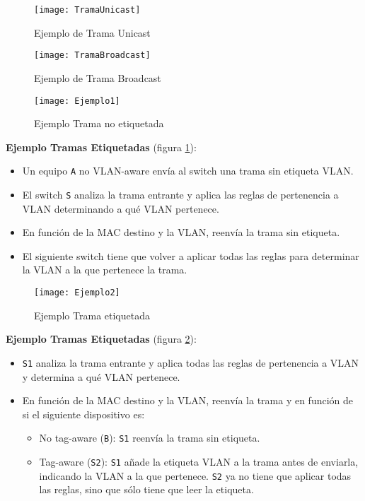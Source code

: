 \documentclass[10pt,portrait, twocolumn]{article}
\begin{document}
\begin{figure}[!ht]	
			\centering
		    	\texttt{[image: TramaUnicast]}
			\caption{Ejemplo de Trama Unicast}
		\end{figure} 
		
\begin{figure}[!ht]	
	\centering
    	\texttt{[image: TramaBroadcast]}
	\caption{Ejemplo de Trama Broadcast}
\end{figure} 

\begin{figure}[!ht]	
	\centering
    	\texttt{[image: Ejemplo1]}
	\caption{Ejemplo Trama no etiquetada}
	\label{fig:E1}
\end{figure} 
	
\textbf{Ejemplo Tramas Etiquetadas} (figura \ref{fig:E1}): 

	\begin{itemize}
	\item Un equipo \texttt{A} no VLAN-aware envía al switch una trama sin etiqueta VLAN.
	\item El switch \texttt{S} analiza la trama entrante y aplica las reglas de pertenencia a VLAN determinando a qué VLAN pertenece.
	\item En función de la MAC destino y la VLAN, reenvía la trama sin etiqueta.
	\item El siguiente switch tiene que volver a aplicar todas las reglas para determinar la VLAN a la que pertenece la trama.
	\end{itemize}
	
\begin{figure}[!ht]	
	\centering
    	\texttt{[image: Ejemplo2]}
	\caption{Ejemplo Trama etiquetada}
	\label{fig:E2}
\end{figure} 
	
\textbf{Ejemplo Tramas Etiquetadas} (figura \ref{fig:E2}): 

	\begin{itemize}
	\item \texttt{S1} analiza la trama entrante y aplica todas las reglas de pertenencia a VLAN y determina a qué VLAN pertenece.
	\item En función de la MAC destino y la VLAN, reenvía la trama y en función de si el siguiente dispositivo es:
	
		\begin{itemize}
		\item No tag-aware (\texttt{B}): \texttt{S1} reenvía la trama sin etiqueta.
		\item Tag-aware (\texttt{S2}): \texttt{S1} añade la etiqueta VLAN a la trama antes de enviarla, indicando la VLAN a la que pertenece. \texttt{S2} ya no tiene que aplicar todas las reglas, sino que sólo tiene que leer la etiqueta.
		\end{itemize}
	\end{itemize}
\end{document}
